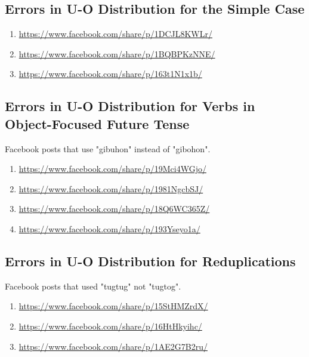 \subsection{Errors in U-O Distribution for the Simple Case}
\begin{enumerate}
    \item \url{https://www.facebook.com/share/p/1DCJL8KWLr/} \\
    \item  \url{https://www.facebook.com/share/p/1BQBPKzNNE/} \\
    \item \url{https://www.facebook.com/share/p/163t1N1x1b/} \\
\end{enumerate}

\subsection{Errors in U-O Distribution for Verbs in Object-Focused Future Tense}
Facebook posts that use "gibuhon" instead of "gibohon".
\begin{enumerate}
    \item \url{https://www.facebook.com/share/p/19Mci4WGjo/}
    \item \url{https://www.facebook.com/share/p/1981NgcbSJ/}
    \item \url{https://www.facebook.com/share/p/18Q6WC365Z/}
    \item \url{https://www.facebook.com/share/p/193Yseyo1a/}
\end{enumerate}

\subsection{Errors in U-O Distribution for Reduplications}
Facebook posts that used "tugtug" not "tugtog".

\begin{enumerate}
    \item \url{https://www.facebook.com/share/p/15StHMZrdX/}
    \item \url{https://www.facebook.com/share/p/16HtHkyihc/}
    \item \url{https://www.facebook.com/share/p/1AE2G7B2ru/}
\end{enumerate}